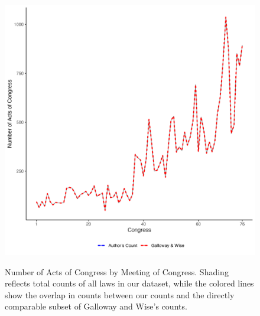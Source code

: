 \documentclass[fleqn,10pt]{wlscirep}
\begin{document}
\begin{figure}[h]
  \centering
  \caption{Number of Acts of Congress by Meeting of Congress. Shading reflects total counts of all laws in our dataset, while the colored lines show the overlap in counts between our counts and the directly comparable subset of Galloway and Wise's counts.}
  \includegraphics[width=\linewidth]{draft/figures/counts_of_laws.png}
    \label{fig:totals}
\end{figure}




\end{document}
